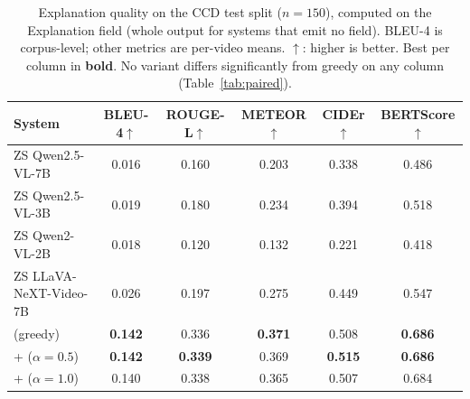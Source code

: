 \begin{table}[!t]
\centering
\caption{Explanation quality on the CCD test split ($n{=}150$), computed on the Explanation field (whole output for systems that emit no field). BLEU-4 is corpus-level; other metrics are per-video means. $\uparrow$: higher is better. Best per column in \textbf{bold}. No \tcd{} variant differs significantly from greedy on any column (Table~\ref{tab:paired}).}
\label{tab:e1}
\small
\setlength{\tabcolsep}{8pt}
\begin{tabular*}{\textwidth}{@{\extracolsep{\fill}}lccccc@{}}
\toprule
\textbf{System} & \textbf{BLEU-4}$\uparrow$ & \textbf{ROUGE-L}$\uparrow$ & \textbf{METEOR}$\uparrow$ & \textbf{CIDEr}$\uparrow$ & \textbf{BERTScore}$\uparrow$ \\
\midrule
ZS Qwen2.5-VL-7B        & 0.016 & 0.160 & 0.203 & 0.338 & 0.486 \\
ZS Qwen2.5-VL-3B        & 0.019 & 0.180 & 0.234 & 0.394 & 0.518 \\
ZS Qwen2-VL-2B          & 0.018 & 0.120 & 0.132 & 0.221 & 0.418 \\
ZS LLaVA-NeXT-Video-7B  & 0.026 & 0.197 & 0.275 & 0.449 & 0.547 \\
\midrule
\crashlogic{} (greedy)                  & \textbf{0.142} & 0.336 & \textbf{0.371} & 0.508 & \textbf{0.686} \\
\crashlogic{} + \tcd{} ($\alpha{=}0.5$) & \textbf{0.142} & \textbf{0.339} & 0.369 & \textbf{0.515} & \textbf{0.686} \\
\crashlogic{} + \tcd{} ($\alpha{=}1.0$) & 0.140 & 0.338 & 0.365 & 0.507 & 0.684 \\
\bottomrule
\end{tabular*}
\end{table}
